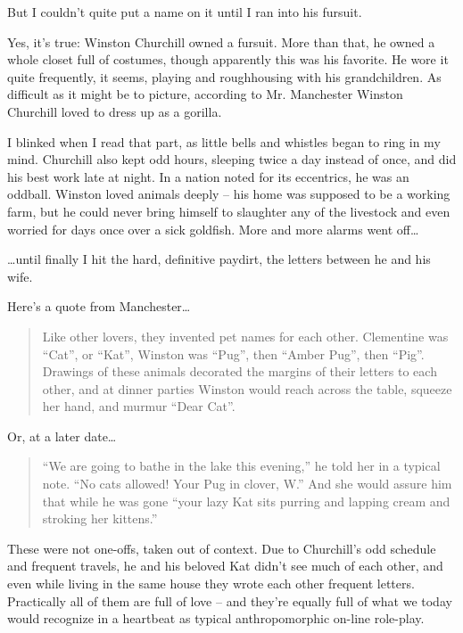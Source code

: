 But I couldn't quite put a name on it until I ran into his fursuit.

Yes, it's true: Winston Churchill owned a fursuit. More than that, he owned a whole closet full of costumes, though apparently this was his favorite. He wore it quite frequently, it seems, playing and roughhousing with his grandchildren. As difficult as it might be to picture, according to Mr. Manchester Winston Churchill loved to dress up as a gorilla.

I blinked when I read that part, as little bells and whistles began to ring in my mind. Churchill also kept odd hours, sleeping twice a day instead of once, and did his best work late at night. In a nation noted for its eccentrics, he was an oddball. Winston loved animals deeply -- his home was supposed to be a working farm, but he could never bring himself to slaughter any of the livestock and even worried for days once over a sick goldfish. More and more alarms went off\ldots

\ldots until finally I hit the hard, definitive paydirt, the letters between he and his wife.

Here's a quote from Manchester\ldots

\begin{quote}
  Like other lovers, they invented pet names for each other. Clementine was ``Cat'', or ``Kat'', Winston was ``Pug'', then ``Amber Pug'', then ``Pig''. Drawings of these animals decorated the margins of their letters to each other, and at dinner parties Winston would reach across the table, squeeze her hand, and murmur ``Dear Cat''.
\end{quote}

Or, at a later date\ldots

\begin{quote}
  ``We are going to bathe in the lake this evening,'' he told her in a typical note. ``No cats allowed! Your Pug in clover, W.'' And she would assure him that while he was gone ``your lazy Kat sits purring and lapping cream and stroking her kittens.''
\end{quote}

These were not one-offs, taken out of context. Due to Churchill's odd schedule and frequent travels, he and his beloved Kat didn't see much of each other, and even while living in the same house they wrote each other frequent letters. Practically all of them are full of love -- and they're equally full of what we today would recognize in a heartbeat as typical anthropomorphic on-line role-play.

